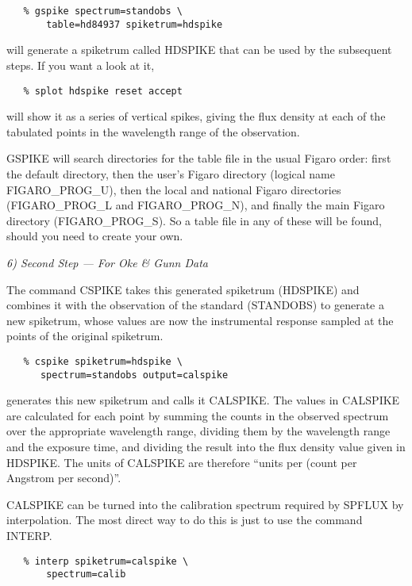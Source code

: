 \begin{verbatim}
   % gspike spectrum=standobs \
       table=hd84937 spiketrum=hdspike
\end{verbatim}

will generate a spike\-trum called HDSPIKE that can be used by the subsequent
steps.  If you want a look at it,

\begin{verbatim}
   % splot hdspike reset accept
\end{verbatim}

will show it as a series of vertical spikes, giving the flux density at
each of the tabulated points in the wavelength range of the observation.

GSPIKE will search directories for the table file in the usual Figaro
order: first the default directory, then the user's Figaro directory
(logical name FIGARO\-\_PROG\-\_U), then the local and national Figaro
directories (FIGARO\-\_PROG\-\_L and FIGARO\-\_PROG\-\_N), and finally
the main Figaro directory (FIGARO\-\_PROG\-\_S).  So a table file in any
of these will be found, should you need to create your own.


\goodbreak
\vspace{12pt}
{\it 6) Second Step --- For Oke \& Gunn Data}

The command CSPIKE takes this generated spike\-trum (HDSPIKE) and
combines it with the observation of the standard (STANDOBS) to generate
a new spike\-trum, whose values are now the instrumental response sampled
at the points of the original spike\-trum.

\begin{verbatim}
   % cspike spiketrum=hdspike \
      spectrum=standobs output=calspike
\end{verbatim}

generates this new spike\-trum and calls it CAL\-SPIKE.  The values in CALSPIKE
are calculated for each point by summing the counts in the observed
spectrum over the appropriate wavelength range, dividing them by the
wavelength range and the exposure time, and dividing the result into
the flux density value given in HDSPIKE.  The units of CALSPIKE are
therefore ``units per (count per Angstrom per second)''.  

CALSPIKE can be turned into the calibration spectrum required by 
SPFLUX by interpolation.  The most direct way to do this is just to
use the command INTERP.

\begin{verbatim}
   % interp spiketrum=calspike \
       spectrum=calib
\end{verbatim}

